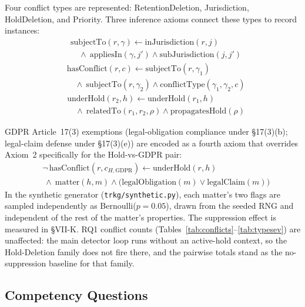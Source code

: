 \documentclass{ieeeaccess}
\begin{document}
Four conflict types are represented: RetentionDeletion, Jurisdiction, HoldDeletion, and Priority. Three inference axioms connect these types to record instances:
\begin{align}
&\mathrm{subjectTo}(r, \gamma) \leftarrow \mathrm{inJurisdiction}(r, j) \nonumber \\
&\quad \wedge\ \mathrm{appliesIn}(\gamma, j') \wedge \mathrm{subJurisdiction}(j, j') \tag{Ax.~1}
\end{align}
\begin{align}
&\mathrm{hasConflict}(r, c) \leftarrow \mathrm{subjectTo}(r, \gamma_1) \nonumber \\
&\quad \wedge\ \mathrm{subjectTo}(r, \gamma_2) \wedge \mathrm{conflictType}(\gamma_1, \gamma_2, c) \tag{Ax.~2}
\end{align}
\begin{align}
&\mathrm{underHold}(r_2, h) \leftarrow \mathrm{underHold}(r_1, h) \nonumber \\
&\quad \wedge\ \mathrm{relatedTo}(r_1, r_2, \rho) \wedge \mathrm{propagatesHold}(\rho) \tag{Ax.~3}
\end{align}

GDPR Article~17(3) exemptions (legal-obligation compliance under §17(3)(b); legal-claim defense under §17(3)(e)) are encoded as a fourth axiom that overrides Axiom~2 specifically for the Hold-vs-GDPR pair:
\begin{align}
&\neg\,\mathrm{hasConflict}(r, c_{H,\mathrm{GDPR}}) \leftarrow \mathrm{underHold}(r, h) \nonumber \\
&\ \wedge\ \mathrm{matter}(h, m) \wedge \big(\mathrm{legalObligation}(m) \vee \mathrm{legalClaim}(m)\big) \tag{Ax.~4}
\end{align}
In the synthetic generator (\texttt{trkg/synthetic.py}), each matter's two flags are sampled independently as Bernoulli($p{=}0.05$), drawn from the seeded RNG and independent of the rest of the matter's properties. The suppression effect is measured in §VII-K. RQ1 conflict counts (Tables~\ref{tab:conflicts}--\ref{tab:typesev}) are unaffected: the main detector loop runs without an active-hold context, so the Hold-Deletion family does not fire there, and the pairwise totals stand as the no-suppression baseline for that family.

\subsection{Competency Questions}
\label{sec:cqs}
\end{document}
